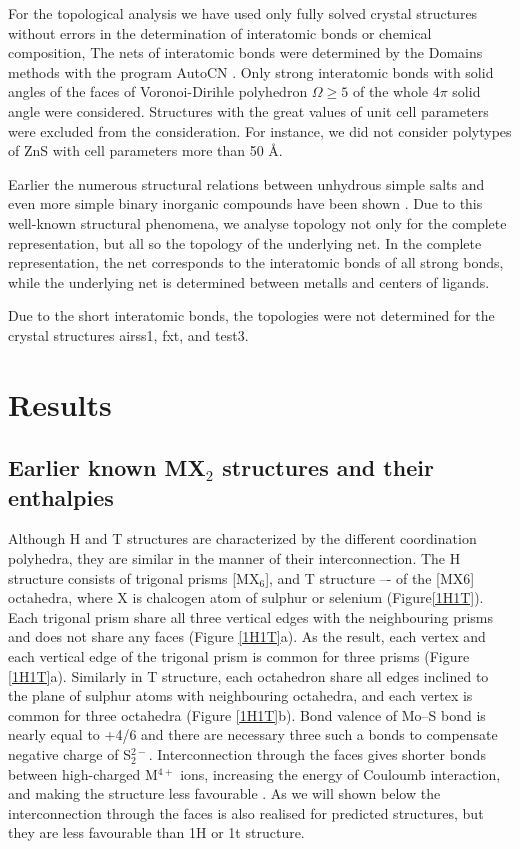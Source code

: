 \documentclass[a4paperm]{article}
\begin{document}
For the topological analysis we have used only fully solved crystal structures without errors in the determination of interatomic bonds or chemical composition,
The nets of interatomic bonds were determined by the Domains methods with the program AutoCN \cite{blatov2016_rods}. 
Only strong interatomic bonds  with solid angles of the faces of Voronoi-Dirihle polyhedron $\Omega \geq 5 $ of the whole 4$\pi$ solid angle were considered.
Structures with the great values of unit cell parameters were excluded from the consideration.
For instance, we did not consider polytypes of ZnS with cell parameters more than 50 \AA.

Earlier the numerous structural relations between unhydrous simple salts and even more simple binary inorganic compounds have been shown \cite{blatov2011_salts, medrish2020_zintl}. 
Due to this well-known structural phenomena, we analyse topology not only for the complete  representation, but all so the topology of the underlying net.
In the complete representation, the net corresponds to the interatomic bonds of all strong bonds, while the underlying net is determined between metalls and centers of ligands.

Due to the short interatomic bonds, the topologies were not determined for the crystal structures airss1, fxt, and  test3.


			\section{Results}

\subsection*{Earlier known MX$_2$ structures and their enthalpies}

Although H and T structures are characterized by the different coordination polyhedra, they are similar in the manner of their interconnection.
The H structure consists of trigonal prisms [MX$_6$], and T structure –- of the [MX6] octahedra, where X is chalcogen atom of sulphur or selenium (Figure\ref{1H1T}).
Each trigonal prism share all three vertical edges with the neighbouring prisms and does not share any faces (Figure \ref{1H1T}a).
As the result, each vertex and each vertical edge of the trigonal prism is common for three prisms (Figure \ref{1H1T}a).
Similarly in T structure, each octahedron share all edges inclined to the plane of sulphur atoms with neighbouring octahedra, and each vertex is common for three octahedra (Figure \ref{1H1T}b).
Bond valence of Mo--S bond is nearly equal to +4/6 and there are necessary three such a bonds to compensate negative charge of S$_2^{2-}$.
Interconnection through the faces gives shorter bonds between high-charged M$^{4+}$ ions, increasing the energy of Couloumb interaction, and making the structure less favourable \cite{pauling1929}.
As we will shown below the interconnection through the faces is also realised for predicted structures, but they are less favourable than 1H or 1t structure.
\end{document}
